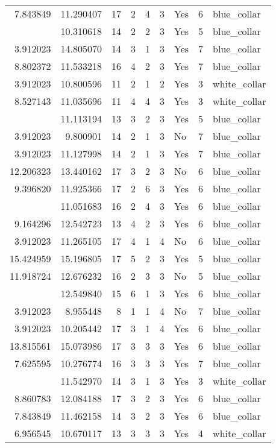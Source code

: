 \documentclass[
]{article}
\begin{document}
\begin{longtable}[t]{rrrrrllrl}
7.843849 & 11.290407 & 17 & 2 & 4 & 3 & Yes & 6 & blue\_collar\\
\addlinespace
7.625595 & 10.310618 & 14 & 2 & 2 & 3 & Yes & 5 & blue\_collar\\
3.912023 & 14.805070 & 14 & 3 & 1 & 3 & Yes & 7 & blue\_collar\\
8.802372 & 11.533218 & 16 & 4 & 2 & 3 & Yes & 7 & blue\_collar\\
3.912023 & 10.800596 & 11 & 2 & 1 & 2 & Yes & 3 & white\_collar\\
8.527143 & 11.035696 & 11 & 4 & 4 & 3 & Yes & 3 & white\_collar\\
\addlinespace
7.625595 & 11.113194 & 13 & 3 & 2 & 3 & Yes & 5 & blue\_collar\\
3.912023 & 9.800901 & 14 & 2 & 1 & 3 & No & 7 & blue\_collar\\
3.912023 & 11.127998 & 14 & 2 & 1 & 3 & Yes & 7 & blue\_collar\\
12.206323 & 13.440162 & 17 & 3 & 2 & 3 & No & 6 & blue\_collar\\
9.396820 & 11.925366 & 17 & 2 & 6 & 3 & Yes & 6 & blue\_collar\\
\addlinespace
9.110520 & 11.051683 & 16 & 2 & 4 & 3 & Yes & 6 & blue\_collar\\
9.164296 & 12.542723 & 13 & 4 & 2 & 3 & Yes & 6 & blue\_collar\\
3.912023 & 11.265105 & 17 & 4 & 1 & 4 & No & 6 & blue\_collar\\
15.424959 & 15.196805 & 17 & 5 & 2 & 3 & Yes & 5 & blue\_collar\\
11.918724 & 12.676232 & 16 & 2 & 3 & 3 & No & 5 & blue\_collar\\
\addlinespace
3.912023 & 12.549840 & 15 & 6 & 1 & 3 & Yes & 6 & blue\_collar\\
3.912023 & 8.955448 & 8 & 1 & 1 & 4 & No & 7 & blue\_collar\\
3.912023 & 10.205442 & 17 & 3 & 1 & 4 & Yes & 6 & blue\_collar\\
13.815561 & 15.073986 & 17 & 3 & 3 & 3 & Yes & 6 & blue\_collar\\
7.625595 & 10.276774 & 16 & 3 & 3 & 3 & Yes & 7 & blue\_collar\\
\addlinespace
3.912023 & 11.542970 & 14 & 3 & 1 & 3 & Yes & 3 & white\_collar\\
8.860783 & 12.084188 & 17 & 3 & 2 & 3 & Yes & 6 & blue\_collar\\
7.843849 & 11.462158 & 14 & 3 & 2 & 3 & Yes & 6 & blue\_collar\\
6.956545 & 10.670117 & 13 & 3 & 3 & 3 & Yes & 4 & white\_collar\\

\end{longtable}
\end{document}
